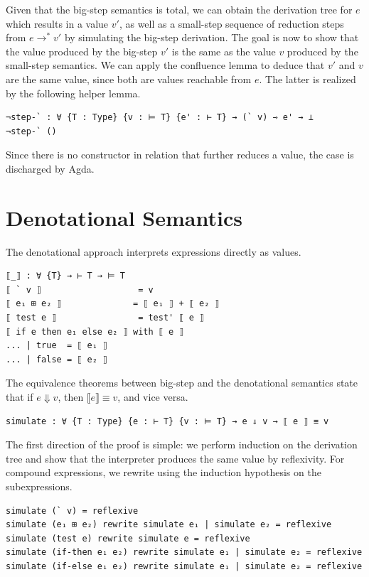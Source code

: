 Given that the big-step semantics is total, we can obtain the derivation tree for $e$ which results in a value $v'$, as well as a small-step 
sequence of reduction steps from $e \longrightarrow^* v'$ by simulating the big-step derivation. 
The goal is now to show that the value produced by the big-step $v'$ is the same as the value $v$ produced by the small-step semantics.
We can apply the confluence lemma to deduce that $v'$ and $v$ are the same value, since both are values reachable from $e$. The latter is realized by the following helper lemma.
\begin{verbatim}
¬step-` : ∀ {T : Type} {v : ⊨ T} {e' : ⊢ T} → (` v) ⇾ e' → ⊥
¬step-` ()
\end{verbatim}
Since there is no constructor in relation that further reduces a value, the case is discharged by Agda.

\section{Denotational Semantics}

The denotational approach interprets expressions directly as values.
\begin{verbatim}
⟦_⟧ : ∀ {T} → ⊢ T → ⊨ T
⟦ ` v ⟧                   = v
⟦ e₁ ⊞ e₂ ⟧              = ⟦ e₁ ⟧ + ⟦ e₂ ⟧
⟦ test e ⟧                = test' ⟦ e ⟧
⟦ if e then e₁ else e₂ ⟧ with ⟦ e ⟧
... | true  = ⟦ e₁ ⟧
... | false = ⟦ e₂ ⟧
\end{verbatim}

The equivalence theorems between big-step and the denotational semantics state that if $e \Downarrow v$, then $\llbracket e \rrbracket \equiv v$, and vice versa.
\begin{verbatim}
simulate : ∀ {T : Type} {e : ⊢ T} {v : ⊨ T} → e ⇓ v → ⟦ e ⟧ ≡ v
\end{verbatim}

The first direction of the proof is simple: we perform induction on the derivation tree and show that the interpreter produces the same value by reflexivity. 
For compound expressions, we rewrite using the induction hypothesis on the subexpressions.

\begin{verbatim}
simulate (` v) = reflexive
simulate (e₁ ⊞ e₂) rewrite simulate e₁ | simulate e₂ = reflexive
simulate (test e) rewrite simulate e = reflexive
simulate (if-then e₁ e₂) rewrite simulate e₁ | simulate e₂ = reflexive
simulate (if-else e₁ e₂) rewrite simulate e₁ | simulate e₂ = reflexive
\end{verbatim}

